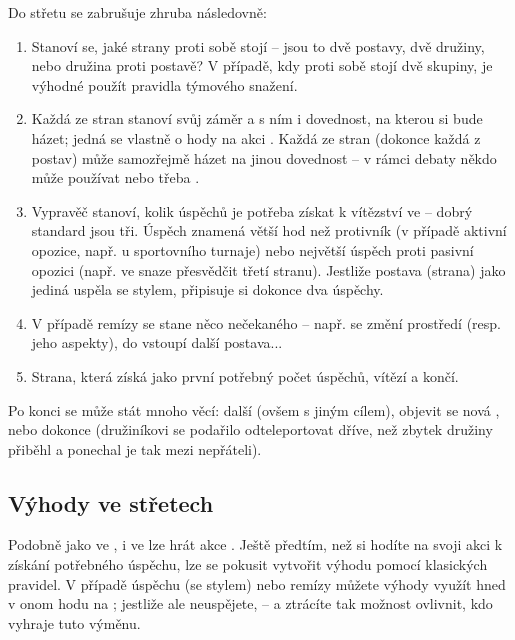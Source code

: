 \documentclass[../main.tex]{subfiles}
\begin{document}
Do střetu se zabrušuje zhruba následovně:
\begin{enumerate}
  \item Stanoví se, jaké strany proti sobě stojí – jsou to dvě postavy, dvě družiny, nebo
    družina proti postavě? V případě, kdy proti sobě stojí dvě skupiny, je výhodné použít
    pravidla týmového snažení.
  \item Každá ze stran stanoví svůj záměr a s ním i dovednost, na kterou si bude házet;
    jedná se vlastně o hody na akci . Každá ze stran (dokonce každá z
    postav) může samozřejmě házet na jinou dovednost – v rámci debaty někdo může používat
     nebo třeba .

  \item Vypravěč stanoví, kolik úspěchů je potřeba získat k vítězství ve  –
    dobrý standard jsou tři. Úspěch znamená větší hod než protivník (v případě aktivní
    opozice, např. u sportovního turnaje) nebo největší úspěch proti pasivní opozici
    (např. ve snaze přesvědčit třetí stranu). Jestliže postava (strana) jako jediná
    uspěla se stylem, připisuje si dokonce dva úspěchy.
  \item V případě remízy se stane něco nečekaného – např. se změní prostředí (resp. jeho
    aspekty), do  vstoupí další postava...
  \item Strana, která získá jako první potřebný počet úspěchů, vítězí a  končí.
\end{enumerate}

Po konci  se může stát mnoho věcí: další  (ovšem s jiným cílem),
objevit se nová , nebo dokonce  (družiníkovi se podařilo
odteleportovat dříve, než zbytek družiny přiběhl a ponechal je tak mezi nepřáteli).

\subsection{Výhody ve střetech}
\label{sec:výhody-střety}

Podobně jako ve , i ve  lze hrát akce .
Ještě předtím, než si hodíte na svoji akci  k získání potřebného úspěchu,
lze se pokusit vytvořit výhodu pomocí klasických pravidel. V případě úspěchu (se stylem)
nebo remízy můžete výhody využít hned v onom hodu na ; jestliže ale
neuspějete,   – a ztrácíte tak
možnost ovlivnit, kdo vyhraje tuto výměnu.
\end{document}
